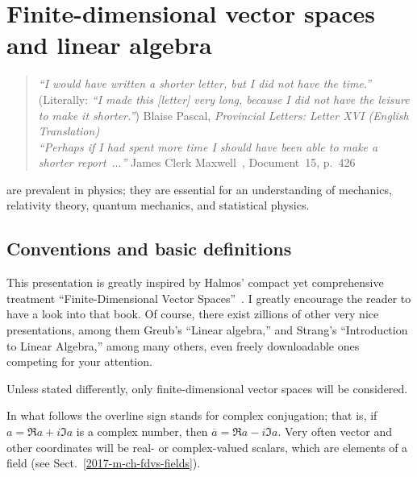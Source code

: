 \chapter{Finite-dimensional vector spaces and linear algebra}
\label{ch:lvs}

\begin{quote}
{\it ``I would have written a shorter letter, but I did not have the time.''}
(Literally: {\it ``I made this [letter] very long, because I did not have the leisure to make it shorter.''})
Blaise Pascal, {\it Provincial Letters: Letter XVI (English Translation)}\\
{\it ``Perhaps if I had spent more time I should have been able to make a shorter report~$\ldots$''}
James Clerk Maxwell~\cite[-2cm]{garber}, Document~15,  p.~426
\end{quote}

 are prevalent in physics;
they are essential for an understanding
of mechanics, relativity theory, quantum mechanics, and statistical physics.

\section{Conventions and basic definitions}



This presentation is greatly inspired
by Halmos' compact yet comprehensive treatment
``Finite-Dimensional Vector Spaces''~\cite[-4cm]{halmos-vs}.
I greatly encourage the reader to have a look into that book.
Of course, there exist zillions of other very nice presentations, among them
Greub's ``Linear algebra,'' and
Strang's ``Introduction to Linear Algebra,''
among many others, even freely downloadable  ones
\cite[-3cm]{Greub75,Strang:2009:ILA,Homes-rorres,lipschutz:schaul-la,Hefferon}
competing for your attention.

Unless stated differently, only
finite-dimensional vector spaces will be considered.

In what follows
the overline sign stands for complex conjugation; that is,
if
${a}= \Re a +i\Im a $ is a complex number, then
$\overline{a}= \Re a -i\Im a$.
Very often vector and other coordinates will be real- or complex-valued scalars, which are elements of a field (see Sect.~\ref{2017-m-ch-fdvs-fields}).


